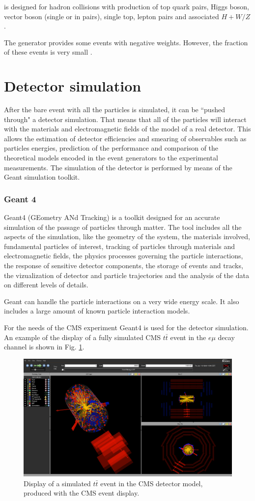 \MCNLO is designed for hadron collisions with production of top quark pairs, Higgs boson, vector boson (single or in pairs), single top,
lepton pairs and associated $H+W/Z$.

The \MCNLO generator provides some events with negative weights. However, the fraction of these events is very small \cite{Frixione:2002ik}.


\section{Detector simulation}

After the bare event with all the particles is simulated, it can be ``pushed through" a detector simulation. That means that all of the particles 
will interact with the materials and electromagnetic fields of the model of a real detector. This allows the estimation of 
detector efficiencies and smearing of observables such as particles energies, prediction of the performance and comparison of the theoretical 
models encoded in the event generators to
the experimental measurements. The simulation of the detector is performed by means of the Geant simulation toolkit.

\subsubsection{Geant 4}

Geant4 (GEometry ANd Tracking) \cite{Agostinelli:2002hh} is a toolkit designed for an accurate simulation of the passage of particles through matter.
The tool includes all the aspects of the simulation, like the geometry of the system, the materials involved, fundamental particles of interest,
tracking of particles through materials and electromagnetic fields, the physics processes governing the particle interactions, the response of
sensitive detector components, the storage of events and tracks, the vizualization of detector and particle trajectories and the analysis of
the data on different levels of details.

Geant can handle the particle interactions on a very wide energy scale. It also includes a large amount of known particle interaction models.

For the needs of the CMS experiment Geant4 is used for the detector simulation. An example of the display of a fully simulated CMS $t\bar{t}$ event
in the $e\mu$ decay channel is shown in Fig. \ref{fig:Evt_display}.

 \begin{figure}
  \centering
  \includegraphics[width=1.0\textwidth]{03_simulation/plots/eventDisplay-39649-11661467.png}
  \caption{Display of a simulated $t\bar{t}$ event in the CMS detector model, produced with the CMS event display.}
  \label{fig:Evt_display}
 \end{figure}